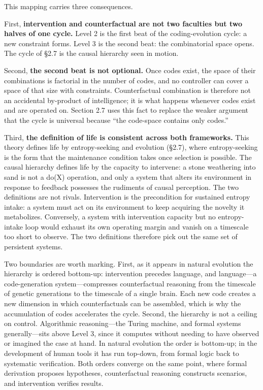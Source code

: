 \documentclass[11pt,a4paper]{article}
\begin{document}
This mapping carries three consequences.

First, \textbf{intervention and counterfactual are not two faculties but two halves of one cycle.} Level 2 is the first beat of the coding-evolution cycle: a new constraint forms. Level 3 is the second beat: the combinatorial space opens. The cycle of \S2.7 is the causal hierarchy seen in motion.

Second, \textbf{the second beat is not optional.} Once codes exist, the space of their combinations is factorial in the number of codes, and no controller can cover a space of that size with constraints. Counterfactual combination is therefore not an accidental by-product of intelligence; it is what happens whenever codes exist and are operated on. Section 2.7 uses this fact to replace the weaker argument that the cycle is universal because ``the code-space contains only codes.''

Third, \textbf{the definition of life is consistent across both frameworks.} This theory defines life by entropy-seeking and evolution (\S2.7), where entropy-seeking is the form that the maintenance condition takes once selection is possible. The causal hierarchy defines life by the capacity to intervene: a stone weathering into sand is not a do(X) operation, and only a system that alters its environment in response to feedback possesses the rudiments of causal perception. The two definitions are not rivals. Intervention is the precondition for sustained entropy intake: a system must act on its environment to keep acquiring the novelty it metabolizes. Conversely, a system with intervention capacity but no entropy-intake loop would exhaust its own operating margin and vanish on a timescale too short to observe. The two definitions therefore pick out the same set of persistent systems.

Two boundaries are worth marking. First, as it appears in natural evolution the hierarchy is ordered bottom-up: intervention precedes language, and language---a code-generation system---compresses counterfactual reasoning from the timescale of genetic generations to the timescale of a single brain. Each new code creates a new dimension in which counterfactuals can be assembled, which is why the accumulation of codes accelerates the cycle. Second, the hierarchy is not a ceiling on control. Algorithmic reasoning---the Turing machine, and formal systems generally---sits above Level 3, since it computes without needing to have observed or imagined the case at hand. In natural evolution the order is bottom-up; in the development of human tools it has run top-down, from formal logic back to systematic verification. Both orders converge on the same point, where formal derivation proposes hypotheses, counterfactual reasoning constructs scenarios, and intervention verifies results.
\end{document}
